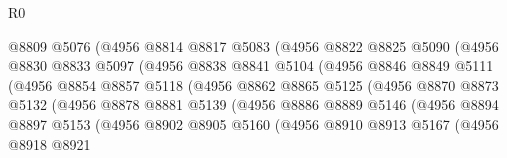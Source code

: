 \begin{lexlean}{R0}
\begin{coremodule}
                          @8809
                          @5076
                          (@4956
                            @8814
                            @8817
                            @5083
                            (@4956
                              @8822
                              @8825
                              @5090
                              (@4956
                                @8830
                                @8833
                                @5097
                                (@4956
                                  @8838
                                  @8841
                                  @5104
                                  (@4956
                                    @8846
                                    @8849
                                    @5111
                                    (@4956
                                      @8854
                                      @8857
                                      @5118
                                      (@4956
                                        @8862
                                        @8865
                                        @5125
                                        (@4956
                                          @8870
                                          @8873
                                          @5132
                                          (@4956
                                            @8878
                                            @8881
                                            @5139
                                            (@4956
                                              @8886
                                              @8889
                                              @5146
                                              (@4956
                                                @8894
                                                @8897
                                                @5153
                                                (@4956
                                                  @8902
                                                  @8905
                                                  @5160
                                                  (@4956
                                                    @8910
                                                    @8913
                                                    @5167
                                                    (@4956
                                                      @8918
                                                      @8921

\end{coremodule}
\end{lexlean}
